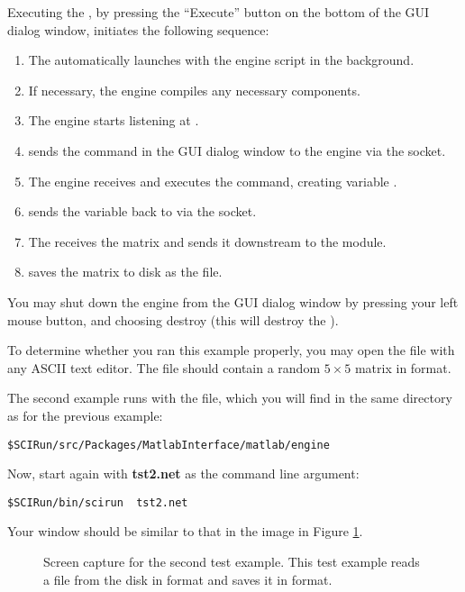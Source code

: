 Executing the \mlm{}, by pressing the ``Execute'' button on the bottom of
the GUI dialog window, initiates the following sequence:
%
\begin{enumerate}
  \item The \mlm{} automatically launches \m{} with the engine script in
        the background. 
  \item If necessary, the engine compiles any necessary components.
  \item The engine starts listening at .
  \item \mlm{} sends the command in the GUI dialog window to the engine
        via the socket.
  \item The engine receives and executes the command, creating
        variable .
  \item \m{} sends the variable
         back to \sr{} via the socket.
  \item The  \mlm{} receives the matrix and sends it downstream to
        the  module. 
  \item {} saves the matrix to disk as the
         file. 
\end{enumerate}

You may shut down the \m{} engine from the \mlm{} GUI dialog window by
pressing your left mouse button, and choosing destroy (this will destroy
the \mlm{}).

To determine whether you ran this example properly, you may open the file
 with any ASCII text editor. The file should contain a
random $5 \times 5$ matrix in \sr{} format.


The second example runs with the  file, which you will
find in the same directory as for the previous example:
%
\begin{verbatim}
$SCIRun/src/Packages/MatlabInterface/matlab/engine
\end{verbatim}

Now, start \sr{} again with {\bf tst2.net} as the command line
argument: 
%
\begin{verbatim}
$SCIRun/bin/scirun  tst2.net
\end{verbatim}
%
Your window should be similar to that in the image in Figure
\ref{fig:tst2}.

\begin{figure}[htb]
  \begin{makeimage}
  \end{makeimage}
  \tsttwo
  \caption{\label{fig:tst2} Screen capture for the second test
  example. This test example reads a
  file from the disk in \sr{} format and saves it in \m{} format.}
\end{figure}

